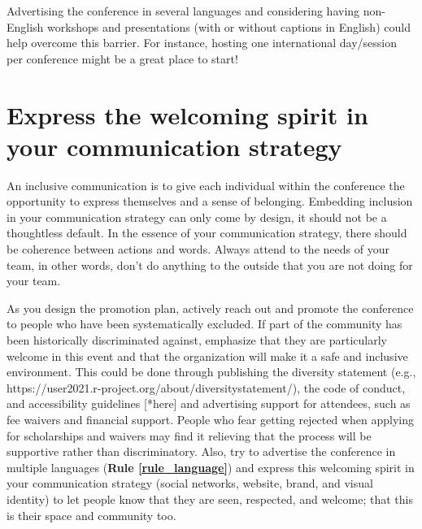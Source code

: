 \documentclass[10pt,letterpaper]{article}
\begin{document}
Advertising the conference in several languages and considering having non-English workshops and presentations (with or without captions in English) could help overcome this barrier. For instance, hosting one international day/session per conference might be a great place to start!


\section{Express the welcoming spirit in your communication strategy}
\label{rule_communication}
An inclusive communication is to give each individual within the conference the opportunity to express themselves and a sense of belonging. Embedding inclusion in your communication strategy can only come by design, it should not be a thoughtless default. In the essence of your communication strategy, there should be coherence between actions and words. Always attend to the needs of your team, in other words, don't do anything to the outside that you are not doing for your team. 

As you design the promotion plan, actively reach out and promote the conference to people who have been systematically excluded. If part of the community has been historically discriminated against, emphasize that they are particularly welcome in this event and that the organization will make it a safe and inclusive environment. This could be done through publishing the diversity statement (e.g., https://user2021.r-project.org/about/diversitystatement/), the code of conduct, and accessibility guidelines [*here] and advertising support for attendees, such as fee waivers and financial support. People who fear getting rejected when applying for scholarships and waivers may find it relieving that the process will be supportive rather than discriminatory. 
Also, try to advertise the conference in multiple languages (\textbf{Rule \ref{rule_language}}) and express this welcoming spirit in your communication strategy (social networks, website, brand, and visual identity) to let people know that they are seen, respected, and welcome; that this is their space and community too.
\end{document}
